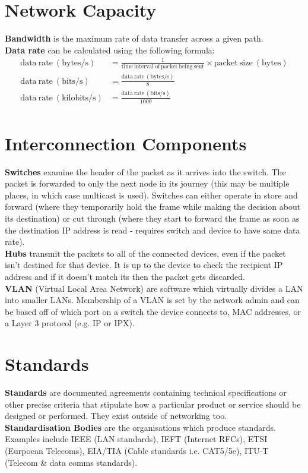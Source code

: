 \documentclass[a4paper,11pt]{article}
\begin{document}
\section{Network Capacity}
\textbf{Bandwidth} is the maximum rate of data transfer across a given path.\\
\textbf{Data rate} can be calculated using the following formula:
\begin{align*}
\mathrm{data\ rate\ (bytes/s)} &= \frac{1}{\mathrm{time\ interval\ of\ packet\ being\ sent}} \times \mathrm{packet\ size\ (bytes)}\\
\mathrm{data\ rate\ (bits/s)} &= \frac{\mathrm{data\ rate\ (bytes/s)}}{8}\\
\mathrm{data\ rate\ (kilobits/s)} &= \frac{\mathrm{data\ rate\ (bits/s)}}{1000}\\
\end{align*}

\section{Interconnection Components}
\textbf{Switches} examine the header of the packet as it arrives into the switch. The packet is forwarded to only the next node in its journey (this may be multiple places, in which case multicast is used). Switches can either operate in store and forward (where they temporarily hold the frame while making the decision about its destination) or cut through (where they start to forward the frame as soon as the destination IP address is read - requires switch and device to have same data rate).\\
\textbf{Hubs} transmit the packets to all of the connected devices, even if the packet isn't destined for that device. It is up to the device to check the recipient IP address and if it doesn't match its then the packet gets discarded.\\
\textbf{VLAN} (Virtual Local Area Network) are software which virtually divides a LAN into smaller LANs. Membership of a VLAN is set by the network admin and can be based off of which port on a switch the device connects to, MAC addresses, or a Layer 3 protocol (e.g. IP or IPX). 

\section{Standards}
\textbf{Standards} are documented agreements containing technical specifications or other precise criteria that stipulate how a particular product or service should be designed or performed. They exist outside of networking too.\\
\textbf{Standardisation Bodies} are the organisations which produce standards. Examples include IEEE (LAN standards), IEFT (Internet RFCs), ETSI (Eurpoean Telecoms), EIA/TIA (Cable standards i.e. CAT5/5e), ITU-T (Telecom \& data comms standards).  
\end{document}
